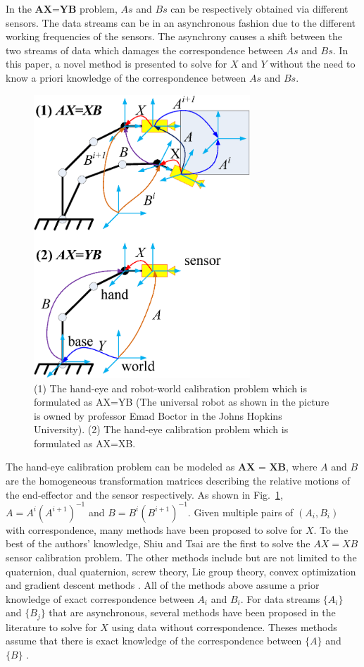 \documentclass[letterpaper, 10 pt, conference]{ieeeconf}  %
\begin{document}
In the $\textbf{AX=YB}$ problem, $As$ and $Bs$ can be respectively obtained via different sensors. The data streams can be in an asynchronous fashion due to the different working frequencies of the sensors. The asynchrony causes a shift between the two streams of data which damages the correspondence between $As$ and $Bs$. In this paper, a novel method is presented to solve for $X$ and $Y$ without the need to know a priori knowledge of the correspondence between $As$ and $Bs$.

\begin{center}
\begin{figure}[htbp]
\centering
\includegraphics[width=3.2in]{fig1.eps}
\caption{
(1) The hand-eye and robot-world calibration problem which is formulated as AX=YB (The universal robot as shown in the picture is owned by professor Emad Boctor in the Johns Hopkins University). (2) The hand-eye calibration problem which is formulated as AX=XB.
}
\label{fig1}
\end{figure}
\end{center}
The hand-eye calibration problem can be modeled as $\textbf{AX = XB}$, where $A$ and $B$ are the homogeneous transformation matrices describing  the relative motions of the end-effector and the  sensor respectively. As shown in Fig.~\ref{fig1}, $A = A^{i}(A^{i+1})^{-1}$ and  $B = B^{i}(B^{i+1})^{-1}$. Given multiple pairs of $(A_i,B_i)$ with correspondence, many methods have been proposed to solve for $X$. To the best of the authors' knowledge, Shiu \cite{Shiu1989} and Tsai \cite{Tsai1989} are the first to solve the $AX = XB$ sensor calibration problem. The other methods include but are not limited to the quaternion, dual quaternion, screw theory, Lie group theory, convex optimization and gradient descent methods \cite{Wang1992,Park1994,Horaud1995,Daniilidis1999,Fassi2005,Zhao2011,Ackerman2014a}. All of the methods above assume a prior knowledge of exact correspondence between $A_i$ and $B_i$. For data streams $\{A_i\}$ and $\{B_j\}$ that are asynchronous, several methods have been proposed in the literature to solve for $X$ using data without correspondence.  Theses methods assume that there is exact knowledge of the correspondence between $\{A\}$ and $\{B\}$ \cite{Ackerman2013a,Ackerman2013,Ackerman2014}.
\end{document}
